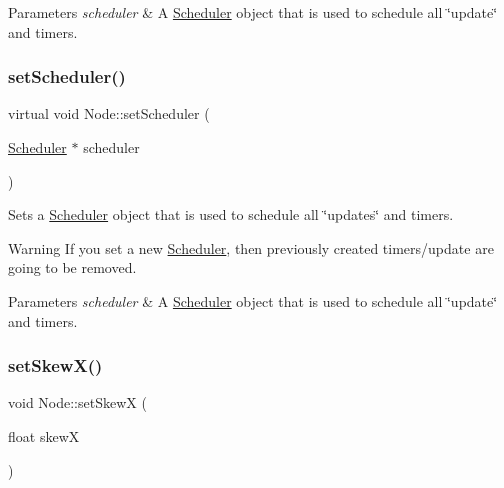 \begin{DoxyParams}{Parameters}
{\em scheduler} & A \hyperlink{classScheduler}{Scheduler} object that is used to schedule all \char`\"{}update\char`\"{} and timers. \\
\hline
\end{DoxyParams}
\mbox{\label{classNode_a06d543a8e7750e30ba3d1efe0de336de}} 
\subsubsection{\texorpdfstring{set\+Scheduler()}{setScheduler()}\hspace{0.1cm}{\footnotesize\ttfamily [2/2]}}
{\footnotesize\ttfamily virtual void Node\+::set\+Scheduler (\begin{DoxyParamCaption}\item[{\hyperlink{classScheduler}{Scheduler} $\ast$}]{scheduler }\end{DoxyParamCaption})\hspace{0.3cm}{\ttfamily [virtual]}}

Sets a \hyperlink{classScheduler}{Scheduler} object that is used to schedule all \char`\"{}updates\char`\"{} and timers.

\begin{DoxyWarning}{Warning}
If you set a new \hyperlink{classScheduler}{Scheduler}, then previously created timers/update are going to be removed. 
\end{DoxyWarning}

\begin{DoxyParams}{Parameters}
{\em scheduler} & A \hyperlink{classScheduler}{Scheduler} object that is used to schedule all \char`\"{}update\char`\"{} and timers. \\
\hline
\end{DoxyParams}
\mbox{\label{classNode_a48cf4d7b304b57a3f593d9eecde3ac7f}} 
\subsubsection{\texorpdfstring{set\+Skew\+X()}{setSkewX()}\hspace{0.1cm}{\footnotesize\ttfamily [1/2]}}
{\footnotesize\ttfamily void Node\+::set\+SkewX (\begin{DoxyParamCaption}\item[{float}]{skewX }\end{DoxyParamCaption})\hspace{0.3cm}{\ttfamily [virtual]}}

